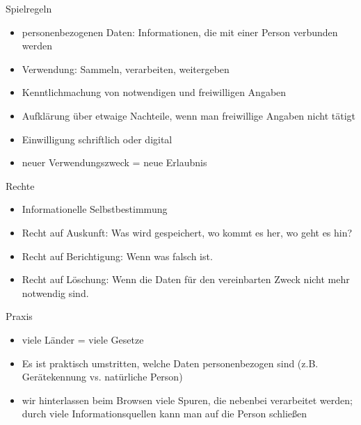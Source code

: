 \documentclass[utf8]{beamer}
\begin{document}
	\begin{frame}{Spielregeln}
		\begin{itemize}
			\item personenbezogenen Daten: Informationen, die mit einer Person verbunden werden
			\item Verwendung: Sammeln, verarbeiten, weitergeben
			\item Kenntlichmachung von notwendigen und freiwilligen Angaben
			\item Aufklärung über etwaige Nachteile, wenn man freiwillige Angaben nicht tätigt
			\item Einwilligung schriftlich oder digital
			\item neuer Verwendungszweck = neue Erlaubnis
		\end{itemize}
	\end{frame}
	
	\begin{frame}{Rechte}
		\begin{itemize}
			\item Informationelle Selbstbestimmung
			\item Recht auf Auskunft: Was wird gespeichert, wo kommt es her, wo geht es hin?
			\item Recht auf Berichtigung: Wenn was falsch ist.
			\item Recht auf Löschung: Wenn die Daten für den vereinbarten Zweck nicht mehr notwendig sind.
		\end{itemize}
	\end{frame}
	
	\begin{frame}{Praxis}
		\begin{itemize}
			\item viele Länder = viele Gesetze
			\item Es ist praktisch umstritten, welche Daten personenbezogen sind (z.B. Gerätekennung vs. natürliche Person)
			\item wir hinterlassen beim Browsen viele Spuren, die nebenbei verarbeitet werden; durch viele Informationsquellen kann man auf die Person schließen
		\end{itemize}
	\end{frame}
	
\end{document}
